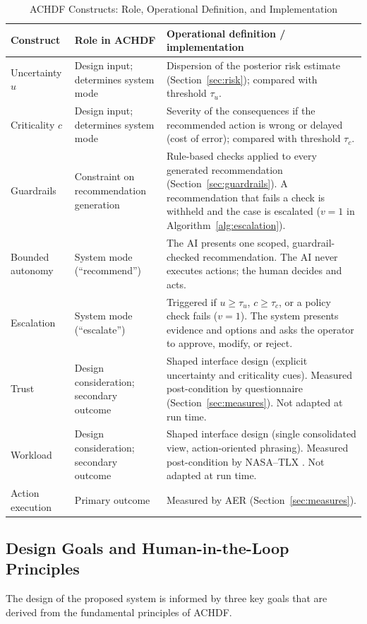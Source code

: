 \documentclass[journal]{IEEEtran}
\theoremstyle{plain}
\theoremstyle{definition}
\providecommand{\DIFaddbegin}{} %
\providecommand{\DIFaddend}{} %
\newcommand{\DIFaddincludegraphics}[2][]{{\color{blue}\fbox{\DIFOincludegraphics[#1]{#2}}}} %
\DeclareRobustCommand{\DIFaddbegin}{\DIFOaddbegin \let\includegraphics\DIFaddincludegraphics} %
\DeclareRobustCommand{\DIFaddend}{\DIFOaddend \let\includegraphics\DIFOincludegraphics} %
\begin{document}
\DIFaddbegin \begin{table}[t]
\centering
\caption{ACHDF Constructs: Role, Operational Definition, and Implementation}
\label{tab:constructs}
\begin{tabular}{p{2.4cm} p{3.4cm} p{10.6cm}}
\toprule
\textbf{Construct} & \textbf{Role in ACHDF} & \textbf{Operational definition / implementation} \\
\midrule
Uncertainty $u$ & Design input; determines system mode & Dispersion of the posterior risk estimate (Section~\ref{sec:risk}); compared with threshold $\tau_u$. \\
Criticality $c$ & Design input; determines system mode & Severity of the consequences if the recommended action is wrong or delayed (cost of error); compared with threshold $\tau_c$. \\
Guardrails & Constraint on recommendation generation & Rule-based checks applied to every generated recommendation (Section~\ref{sec:guardrails}). A recommendation that fails a check is withheld and the case is escalated ($v=1$ in Algorithm~\ref{alg:escalation}). \\
Bounded autonomy & System mode (``recommend'') & The AI presents one scoped, guardrail-checked recommendation. The AI never executes actions; the human decides and acts. \\
Escalation & System mode (``escalate'') & Triggered if $u \ge \tau_u$, $c \ge \tau_c$, or a policy check fails ($v=1$). The system presents evidence and options and asks the operator to approve, modify, or reject. \\
Trust & Design consideration; secondary outcome & Shaped interface design (explicit uncertainty and criticality cues). Measured post-condition by questionnaire (Section~\ref{sec:measures}). Not adapted at run time. \\
Workload & Design consideration; secondary outcome & Shaped interface design (single consolidated view, action-oriented phrasing). Measured post-condition by NASA--TLX \cite{Hart1988}. Not adapted at run time. \\
Action execution & Primary outcome & Measured by AER (Section~\ref{sec:measures}). \\
\bottomrule
\end{tabular}
\end{table}

    \DIFaddend \subsection{Design Goals and Human-in-the-Loop Principles}
    The design of the proposed system is informed by three key goals that are derived from the fundamental principles of ACHDF.
\end{document}
